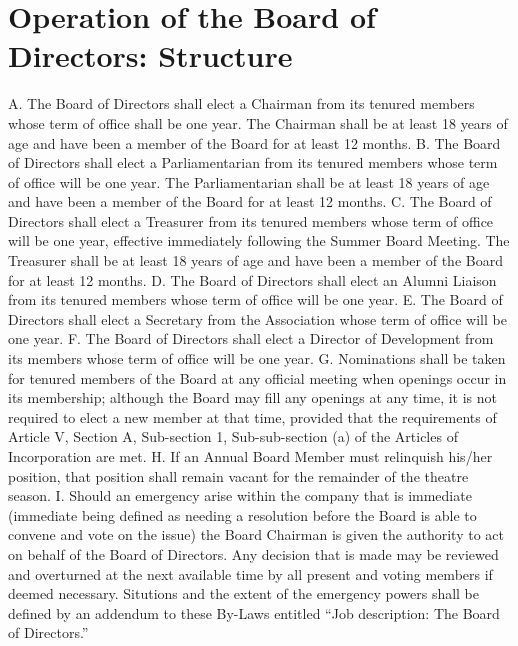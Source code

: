 \documentclass{wst}
\begin{document}
\section{Operation of the Board of Directors: Structure}
A.	The Board of Directors shall elect a Chairman from its tenured members whose term of office shall be one year. The Chairman shall be at least 18 years of age and have been a member of the Board for at least 12 months.
B.	The Board of Directors shall elect a Parliamentarian from its tenured members whose term of office will be one year.  The Parliamentarian shall be at least 18 years of age and have been a member of the Board for at least 12 months.
C.	The Board of Directors shall elect a Treasurer from its tenured members whose term of office will be one year, effective immediately following the Summer Board Meeting.  The Treasurer shall be at least 18 years of age and have been a member of the Board for at least 12 months.
D.	The Board of Directors shall elect an Alumni Liaison from its tenured members whose term of office will be one year.
E.	The Board of Directors shall elect a Secretary from the Association whose term of office will be one year.
F.	The Board of Directors shall elect a Director of Development from its members whose term of office will be one year.
G.	Nominations shall be taken for tenured members of the Board at any official meeting when openings occur in its membership; although the Board may fill any openings at any time, it is not required to elect a new member at that time, provided that the requirements of Article V, Section A, Sub-section 1, Sub-sub-section (a) of the Articles of Incorporation are met.
H.	If an Annual Board Member must relinquish his/her position, that position shall remain vacant for the remainder of the theatre season.
I.	Should an emergency arise within the company that is immediate (immediate being defined as needing a resolution before the Board is able to convene and vote on the issue) the Board Chairman is given the authority to act on behalf of the Board of Directors.  Any decision that is made may be reviewed and overturned at the next available time by all present and voting members if deemed necessary.  Situtions and the extent of the emergency powers shall be defined by an addendum to these By-Laws entitled “Job description: The Board of Directors.”
\end{document}

